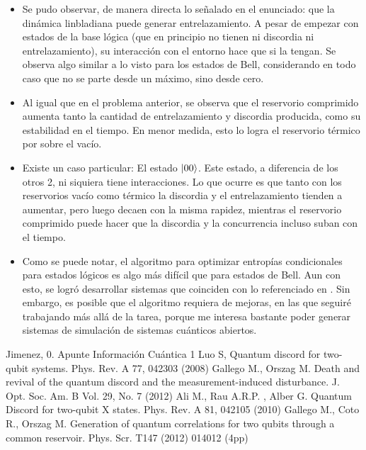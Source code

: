 \documentclass{book}
\begin{document}
\begin{itemize}
    \item Se pudo observar, de manera directa lo señalado en el enunciado: que la dinámica linbladiana puede generar entrelazamiento. A pesar de empezar con estados de la base lógica (que en principio no tienen ni discordia ni entrelazamiento), su interacción con el entorno hace que si la tengan. Se observa algo similar a lo visto para los estados de Bell, considerando en todo caso que no se parte desde un máximo, sino desde cero.
    \item Al igual que en el problema anterior, se observa que el reservorio comprimido aumenta tanto la cantidad de entrelazamiento y discordia producida, como su estabilidad en el tiempo. En menor medida, esto lo logra el reservorio térmico por sobre el vacío. 
    \item Existe un caso particular: El estado ${\ket{00}}$. Este estado, a diferencia de los otros 2, ni siquiera tiene interacciones. Lo que ocurre es que tanto con los reservorios vacío como térmico la discordia y el entrelazamiento tienden a aumentar, pero luego decaen con la misma rapidez, mientras el reservorio comprimido puede hacer que la discordia y la concurrencia incluso suban con el tiempo.
    \item Como se puede notar, el algoritmo para optimizar entropías condicionales para estados lógicos es algo más difícil que para estados de Bell. Aun con esto, se logró desarrollar sistemas que coinciden con lo referenciado en \cite{Results}. Sin embargo, es posible que el algoritmo requiera de mejoras, en las que seguiré trabajando más allá de la tarea, porque me interesa bastante poder generar sistemas de simulación de sistemas cuánticos abiertos.
    
\end{itemize}
\begin{thebibliography}{XXX0000}
   Jimenez, 0. Apunte Información Cuántica 1
     Luo S, Quantum discord for two-qubit systems. Phys. Rev. A 77, 042303 (2008)
   Gallego M., Orszag M. Death and revival of the quantum discord and the
measurement-induced disturbance. J. Opt. Soc. Am. B Vol. 29, No. 7 (2012)
 Ali M., Rau A.R.P. , Alber G. Quantum Discord for two-qubit X states. Phys. Rev. A 81, 042105 (2010)
   Gallego M., Coto R., Orszag M. Generation of quantum correlations for
two qubits through a common reservoir. Phys. Scr. T147 (2012) 014012 (4pp)
\end{thebibliography}
\end{document}
